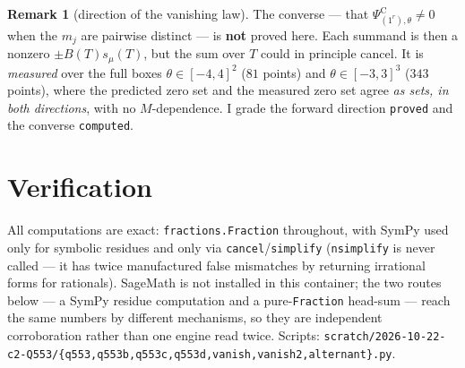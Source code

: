 \documentclass[11pt]{article}
\theoremstyle{definition}
\newtheorem{remark}[theorem]{Remark}
\theoremstyle{remark}
\newcommand{\PsiC}{\Psi^{\mathrm{C}}}
\begin{document}
\begin{remark}[direction of the vanishing law]\label{rem:converse}
The converse --- that $\PsiC_{(1^r),\theta}\neq0$ when the $m_j$ are pairwise distinct ---
is \textbf{not} proved here. Each summand is then a nonzero $\pm B(T)s_\mu(T)$, but the sum
over $T$ could in principle cancel. It is \emph{measured} over the full boxes
$\theta\in[-4,4]^2$ ($81$ points) and $\theta\in[-3,3]^3$ ($343$ points), where the
predicted zero set and the measured zero set agree \emph{as sets, in both directions},
with no $M$-dependence. I grade the forward direction \texttt{proved} and the converse
\texttt{computed}.
\end{remark}

\section{Verification}\label{sec:verif}

All computations are exact: \texttt{fractions.Fraction} throughout, with SymPy used only
for symbolic residues and only via \texttt{cancel}/\texttt{simplify}
(\texttt{nsimplify} is never called --- it has twice manufactured false mismatches by
returning irrational forms for rationals). SageMath is not installed in this container;
the two routes below --- a SymPy residue computation and a pure-\texttt{Fraction}
head-sum --- reach the same numbers by different mechanisms, so they are independent
corroboration rather than one engine read twice. Scripts:
\texttt{scratch/2026-10-22-c2-Q553/\{q553,q553b,q553c,q553d,vanish,vanish2,alternant\}.py}.
\end{document}

